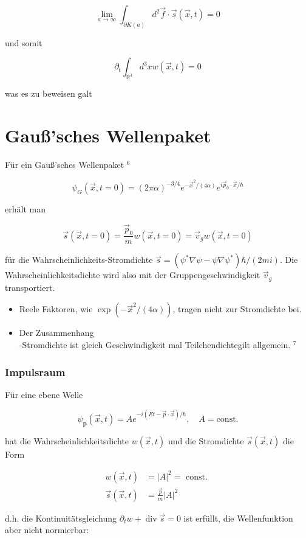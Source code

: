 \documentclass[10pt, letterpaper]{article}
\begin{document}
$$
\lim _{a \rightarrow \infty} \int_{\partial K(a)} d^{2} \vec{f} \cdot \vec{s}(\vec{x}, t)=0
$$

und somit

$$
\partial_{t} \int_{\mathbb{R}^{3}} d^{3} x w(\vec{x}, t)=0
$$

was es zu beweisen galt

\section*{Gauß'sches Wellenpaket}
Für ein Gauß'sches Wellenpaket ${ }^{6}$

$$
\psi_{G}(\vec{x}, t=0)=(2 \pi \alpha)^{-3 / 4} e^{-\vec{x}^{2} /(4 \alpha)} e^{i \vec{p}_{0} \cdot \vec{x} / \hbar}
$$

erhält man

$$
\vec{s}(\vec{x}, t=0)=\frac{\vec{p}_{0}}{m} w(\vec{x}, t=0)=\vec{v}_{g} w(\vec{x}, t=0)
$$

für die Wahrscheinlichkeits-Stromdichte $\vec{s}=\left(\psi^{*} \nabla \psi-\psi \nabla \psi^{*}\right) \hbar /(2 m i)$. Die Wahrscheinlichkeitsdichte wird also mit der Gruppengeschwindigkeit $\vec{v}_{g}$ transportiert.

\begin{itemize}
  \item Reele Faktoren, wie $\exp \left(-\vec{x}^{2} /(4 \alpha)\right)$, tragen nicht zur Stromdichte bei.
  \item Der Zusammenhang\\
-Stromdichte ist gleich Geschwindigkeit mal Teilchendichtegilt allgemein. ${ }^{7}$
\end{itemize}

\subsubsection*{Impulsraum}
Für eine ebene Welle

$$
\psi_{\mathbf{p}}(\vec{x}, t)=A e^{-i(E t-\vec{p} \cdot \vec{x}) / \hbar}, \quad A=\mathrm{const} .
$$

hat die Wahrscheinlichkeitsdichte $w(\vec{x}, t)$ und die Stromdichte $\vec{s}(\vec{x}, t)$ die Form

$$
\begin{aligned}
w(\vec{x}, t) & =|A|^{2}=\text { const. } \\
\vec{s}(\vec{x}, t) & =\frac{\vec{p}}{m}|A|^{2}
\end{aligned}
$$

d.h. die Kontinuitätsgleichung $\partial_{t} w+\operatorname{div} \vec{s}=0$ ist erfüllt, die Wellenfunktion aber nicht normierbar:
\end{document}

